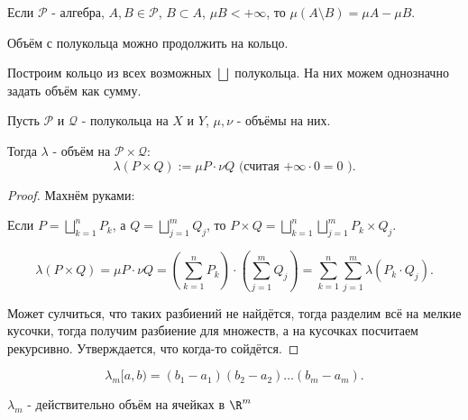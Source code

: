 \begin{remark} \thmslashn

    Если $\mathcal{P}$ - алгебра, $A, B\in \mathcal{P}$, $B \subset A$, $\mu B < +\infty$, то $\mu (A \setminus B) = \mu A - \mu B$. 
\end{remark}
\begin{remark} \thmslashn

    Объём с полукольца можно продолжить на кольцо.

    Построим кольцо из всех возможных $\bigsqcup$ полукольца. На них можем однозначно задать объём как сумму.
\end{remark}
\begin{theorem} \thmslashn

    Пусть $\mathcal{P}$ и $\mathcal{Q}$ - полукольца на $X$ и $Y$, $\mu, \nu$ - объёмы на них.

    Тогда $\lambda$ - объём на $\mathcal{P} \times \mathcal{Q}$:
    \[ \lambda(P \times Q) := \mu P \cdot \nu Q \text{ (считая $+\infty \cdot 0 = 0$ )}.\]

    \begin{proof} \thmslashn
    
       Махнём руками:

       Если $P = \bigsqcup\limits_{k=1}^{n} P_{k}$, а $Q = \bigsqcup\limits_{j=1}^{m} Q_{j}$, то $P \times Q = \bigsqcup_{k=1}^{n} \bigsqcup_{j=1}^{m} P_{k} \times Q_{j}$.

       \[ \lambda(P \times Q) = \mu P \cdot \nu Q = \left(\sum\limits_{k=1}^{n} P_{k}\right) \cdot \left( \sum\limits_{j=1}^{m} Q_{j} \right) = \sum\limits_{k=1}^{n} \sum\limits_{j=1}^{m} \lambda(P_{k} \cdot Q_{j}).\]

       Может сулчиться, что таких разбиений не найдётся, тогда разделим всё на мелкие кусочки, тогда получим разбиение для множеств, а на кусочках посчитаем рекурсивно. Утверждается, что когда-то сойдётся.
    \end{proof}
\end{theorem}
\begin{consequence} \thmslashn

    \[ \lambda_{m} [a, b) = (b_1 - a_1)(b_2 - a_2) \ldots (b_{m} - a_{m}) .\]

    $\lambda_{m}$ - действительно объём на ячейках в $\R^{m}$
\end{consequence}
